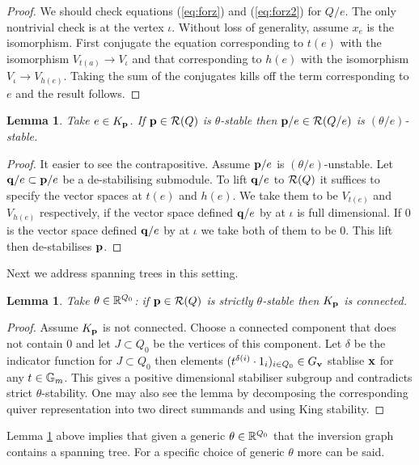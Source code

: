 \documentclass{amsart}
\newtheorem{lem}[thm]{Lemma}
\theoremstyle{definition}
\begin{document}
\begin{proof}
We should check equations (\ref{eq:forz}) and (\ref{eq:forz2}) for $Q/e$.
The only nontrivial check is at the vertex $\iota$.
Without loss of generality, assume $x_e$ is the isomorphism.
First conjugate the equation corresponding to $t(e)$ with the isomorphism $V_{t(a)} \rightarrow V_\iota$ and that corresponding to $h(e)$ with the isomorphism $V_\iota \rightarrow V_{h(e)}$.
Taking the sum of the conjugates kills off the term corresponding to $e$ and the result follows.
\end{proof}

\begin{lem}
Take $e\in K_{\mathbf{p}}$. If $\mathbf{p} \in \mathcal{R}(Q)$ is $\theta$-stable then $\mathbf{p}/e \in \mathcal{R}(Q/e)$ is $(\theta/e)$-stable.
\end{lem}

\begin{proof}
It easier to see the contrapositive.
Assume $\mathbf{p}/e$ is $(\theta/e)$-unstable.
Let $\mathbf{q}/e \subset \mathbf{p}/e$ be a de-stabilising submodule.
To lift $\mathbf{q}/e$ to $\mathcal{R}(Q)$ it suffices to specify the vector spaces at $t(e)$ and $h(e)$.
We take them to be $V_{t(e)}$ and $V_{h(e)}$ respectively, if the vector space defined $\mathbf{q}/e$ by at $\iota$ is full dimensional.
If $0$ is the vector space defined $\mathbf{q}/e$ by at $\iota$ we take both of them to be 0.
This lift then de-stabilises $\mathbf{p}$.
\end{proof}

Next we address spanning trees in this setting.

\begin{lem}\label{lm:coninvgr2}
Take $\theta \in \mathbb{R}^{Q_0}$: if $\mathbf{p} \in \mathcal{R}(Q)$ is strictly $\theta$-stable then $K_{\mathbf{p}}$ is connected.
\end{lem}

\begin{proof}
Assume $K_{\mathbf{p}}$ is not connected. Choose a connected component that does not contain $0$ and let $J \subset Q_0$ be the vertices of this component. 
Let $\delta$ be the indicator function for $J \subset Q_0$ then elements $(t^{\delta(i)}\cdot 1_i)_{i \in Q_0} \in  G_{\mathbf{v}}$ stablise $\mathbf{x}$ for any $t \in \mathbb{G}_m$.
This gives a positive dimensional stabiliser subgroup and contradicts strict $\theta$-stability.
One may also see the lemma by decomposing the corresponding quiver representation into two direct summands and using King stability.
\end{proof}

Lemma \ref{lm:coninvgr2} above implies that given a generic $\theta \in \mathbb{R}^{Q_0}$ that the inversion graph contains a spanning tree.
For a specific choice of generic $\theta$ more can be said.
\end{document}
